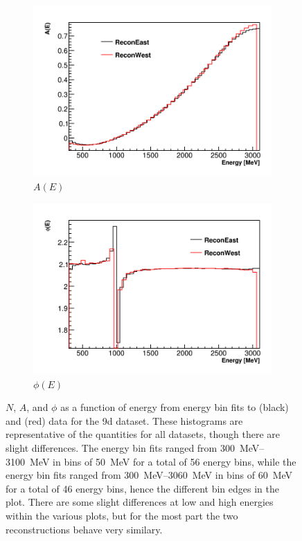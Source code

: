 \begin{figure}[]
    \begin{subfigure}[t]{0.45\textwidth}
        \centering
        \includegraphics[width=\textwidth]{ReconEastvWest_A}
        \caption{$A(E)$}
    \end{subfigure}
    \hspace{1mm}
    \begin{subfigure}[t]{0.45\textwidth}
        \centering
        \includegraphics[width=\textwidth]{ReconEastvWest_Phi}
        \caption{$\phi(E)$}
    \end{subfigure}
\caption[]{$N$, $A$, and $\phi$ as a function of energy from energy bin fits to \RE (black) and \RW (red) data for the 9d dataset. These histograms are representative of the quantities for all datasets, though there are slight differences. The \RE energy bin fits ranged from \SIrange{300}{3100}{\MeV} in bins of \SI{50}{\MeV} for a total of 56 energy bins, while the \RW energy bin fits ranged from \SIrange{300}{3060}{\MeV} in bins of \SI{60}{\MeV} for a total of 46 energy bins, hence the different bin edges in the plot. There are some slight differences at low and high energies within the various plots, but for the most part the two reconstructions behave very similary.}
\label{fig:energyBinFits}
\end{figure}



